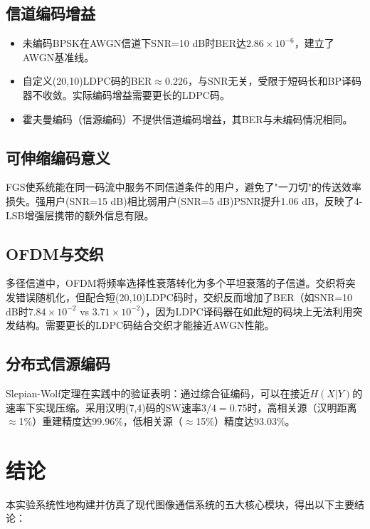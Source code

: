 \documentclass[12pt, a4paper]{article}
\begin{document}
\subsection{信道编码增益}

\begin{itemize}
    \item 未编码BPSK在AWGN信道下SNR=10 dB时BER达$2.86\times10^{-6}$，建立了AWGN基准线。
    \item 自定义(20,10)LDPC码的BER$\approx 0.226$，与SNR无关，受限于短码长和BP译码器不收敛。实际编码增益需要更长的LDPC码。
    \item 霍夫曼编码（信源编码）不提供信道编码增益，其BER与未编码情况相同。
\end{itemize}

\subsection{可伸缩编码意义}

FGS使系统能在同一码流中服务不同信道条件的用户，避免了"一刀切"的传送效率损失。强用户(SNR=15 dB)相比弱用户(SNR=5 dB)PSNR提升1.06 dB，反映了4-LSB增强层携带的额外信息有限。

\subsection{OFDM与交织}

多径信道中，OFDM将频率选择性衰落转化为多个平坦衰落的子信道。交织将突发错误随机化，但配合短(20,10)LDPC码时，交织反而增加了BER（如SNR=10 dB时$7.84\times10^{-2}$ vs $3.71\times10^{-2}$），因为LDPC译码器在如此短的码块上无法利用突发结构。需要更长的LDPC码结合交织才能接近AWGN性能。

\subsection{分布式信源编码}

Slepian-Wolf定理在实践中的验证表明：通过综合征编码，可以在接近$H(X|Y)$的速率下实现压缩。采用汉明(7,4)码的SW速率$3/4=0.75$时，高相关源（汉明距离$\approx$1\%）重建精度达99.96\%，低相关源（$\approx$15\%）精度达93.03\%。

\section{结论}

本实验系统性地构建并仿真了现代图像通信系统的五大核心模块，得出以下主要结论：
\end{document}

